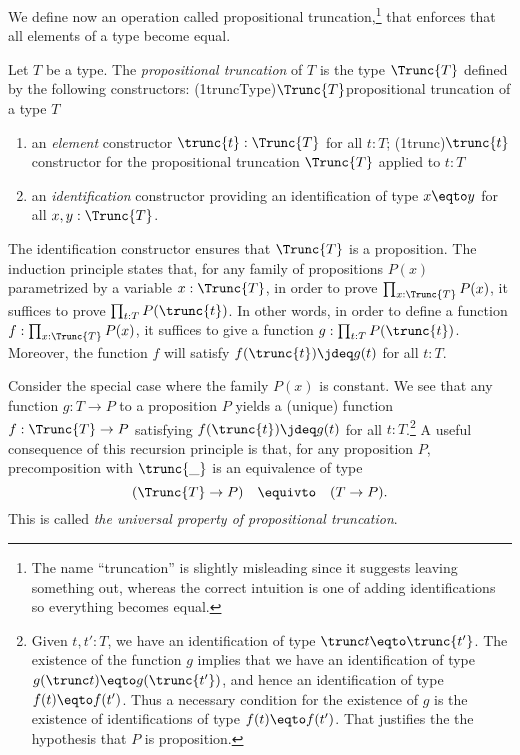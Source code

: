 We define now an operation called propositional truncation,\footnote{%
The name ``truncation'' is slightly misleading since it suggests leaving
something out, whereas the correct intuition is one of adding identifications
so everything becomes equal.}
that enforces that all elements of a type become equal.

\begin{definition}\label{def:prop-trunc}
Let $T$ be a type. The \emph{propositional truncation} of $T$
is the type  $\Trunc{T}$ defined by the following constructors:%
%
%
\glossary(1truncType){$\protect\Trunc{T}$}{propositional truncation of a type $T$}
\begin{enumerate}
\item an \emph{element} constructor $\trunc{t} : \Trunc{T}$ for all $t:T$;%
  \glossary(1trunc){$\protect\trunc{t}$}{constructor for the propositional truncation $\Trunc{T}$ applied to $t:T$}
\item an \emph{identification} constructor providing an identification of type $x \eqto y$  for all $x,y:\Trunc{T}$.
\end{enumerate}
The identification constructor ensures that $\Trunc{T}$ is a
proposition. The induction principle states that,
for any family of propositions $P(x)$ parametrized by a variable $x:\Trunc{T}$,
in order to prove $\prod_{x:\Trunc{T}} P(x)$,
it suffices to prove $\prod_{t:T} P(\trunc{t})$. In other
words, in order to define a function $f:\prod_{x:\Trunc{T}} P(x)$,
it suffices to give a function $g: \prod_{t:T} P(\trunc{t})$.
Moreover, the function $f$ will satisfy $f(\trunc{t})\jdeq g(t)$ for all $t:T$.
\end{definition}

Consider the special case where the family $P(x)$ is constant.
We see that any function $g: T\to P$ to a proposition $P$ yields a (unique) function $f:\Trunc{T}\to P$
satisfying $f(\trunc{t})\jdeq g(t)$ for all $t:T$.\footnote{%
Given $t, t' : T$, we have an identification of type $ \trunc t \eqto \trunc {t'} $.
The existence of the function $g$ implies that we have an identification of type $ g(\trunc t) \eqto g(\trunc {t'}) $,
and hence an identification of type $f(t) \eqto f(t')$.  Thus a necessary condition for the existence of $g$ is
the existence of identifications of type $f(t) \eqto f(t')$.  That justifies the
the hypothesis that $P$ is proposition.}
A useful consequence of this recursion principle is that,
for any proposition $P$, precomposition with $\trunc{\_}$ is an equivalence of type
\[
(\Trunc{T} \to P) \quad \equivto \quad (T \to P).
\]
This is called \emph{the universal property of propositional truncation}.

